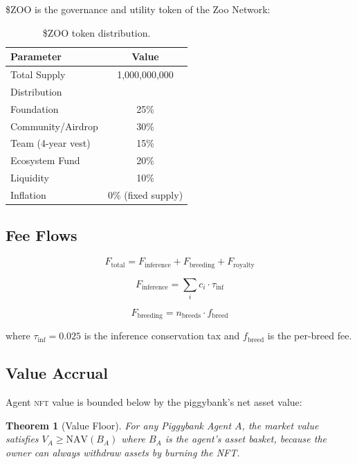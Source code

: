 \documentclass[11pt,letterpaper]{article}
\newtheorem{theorem}{Theorem}[section]
\newcommand{\NFT}{\textsc{nft}}
\begin{document}
\$ZOO is the governance and utility token of the Zoo Network:

\begin{table}[t]
\centering
\begin{tabular}{lc}
\toprule
\textbf{Parameter} & \textbf{Value} \\
\midrule
Total Supply & 1,000,000,000 \\
Distribution & \\
\quad Foundation & 25\% \\
\quad Community/Airdrop & 30\% \\
\quad Team (4-year vest) & 15\% \\
\quad Ecosystem Fund & 20\% \\
\quad Liquidity & 10\% \\
Inflation & 0\% (fixed supply) \\
\bottomrule
\end{tabular}
\caption{\$ZOO token distribution.}
\label{tab:zoo-token}
\end{table}

\subsection{Fee Flows}

\begin{equation}
F_{\text{total}} = F_{\text{inference}} + F_{\text{breeding}} + F_{\text{royalty}}
\end{equation}

\begin{equation}
F_{\text{inference}} = \sum_{i} c_i \cdot \tau_{\text{inf}}
\end{equation}

\begin{equation}
F_{\text{breeding}} = n_{\text{breeds}} \cdot f_{\text{breed}}
\end{equation}

where $\tau_{\text{inf}} = 0.025$ is the inference conservation tax and $f_{\text{breed}}$ is the per-breed fee.

\subsection{Value Accrual}

Agent \NFT{} value is bounded below by the piggybank's net asset value:

\begin{theorem}[Value Floor]
\label{thm:floor}
For any Piggybank Agent $A$, the market value satisfies $V_A \geq \text{NAV}(B_A)$ where $B_A$ is the agent's asset basket, because the owner can always withdraw assets by burning the NFT.
\end{theorem}
\end{document}
